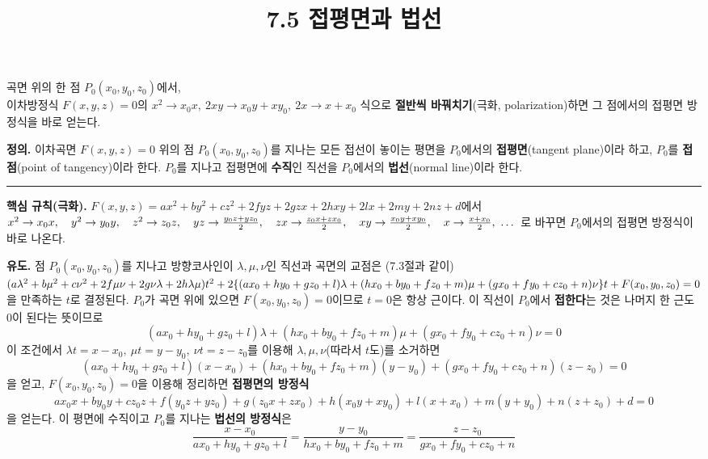 \documentclass{article}
\title{7.5 접평면과 법선}
\date{}
\author{}
\theoremstyle{mystyle}
\begin{document}
\maketitle

\begin{tcolorbox}[colback=blue!5, colframe=blue!60!black, title=7.5 접평면과 법선 -- 한눈에 보기, boxrule=0.5mm, arc=3mm]
곡면 위의 한 점 \(P_0(x_0,y_0,z_0)\)에서,\\ 이차방정식 \(F(x,y,z)=0\)의 \(x^2\to x_0x,\ 2xy\to x_0y+xy_0,\ 2x\to x+x_0\) 식으로 \textbf{절반씩 바꿔치기}(극화, polarization)하면 그 점에서의 접평면 방정식을 바로 얻는다.
\end{tcolorbox}

\begin{tcolorbox}[
    colback=teal!4,
    colframe=teal!65!black,
    title=정의 \& 핵심 규칙,
    fonttitle=\bfseries,
    boxrule=0.5mm,
    arc=3mm
    ]
    \textbf{\textcolor{teal!65!black}{정의.}}\quad
    이차곡면 \(F(x,y,z)=0\) 위의 점 \(P_0(x_0,y_0,z_0)\)를 지나는 모든 접선이 놓이는 평면을 \(P_0\)에서의 \textbf{접평면}(tangent plane)이라 하고, \(P_0\)를 \textbf{접점}(point of tangency)이라 한다. \(P_0\)를 지나고 접평면에 \textbf{수직}인 직선을 \(P_0\)에서의 \textbf{법선}(normal line)이라 한다.

    \noindent\textcolor{teal!50!black}{\rule{\linewidth}{0.4pt}}

    \textbf{\textcolor{teal!65!black}{핵심 규칙(극화).}}\quad
    \(F(x,y,z)=ax^2+by^2+cz^2+2fyz+2gzx+2hxy+2lx+2my+2nz+d\)에서 \\
    $
    x^2\to x_0x,\quad y^2\to y_0y,\quad z^2\to z_0z,\\
    \quad yz\to\tfrac{y_0z+yz_0}{2},\quad zx\to\tfrac{z_0x+zx_0}{2},\quad xy\to\tfrac{x_0y+xy_0}{2},\\
    \quad x\to\tfrac{x+x_0}{2},\ \dots
    $
    로 바꾸면 \(P_0\)에서의 접평면 방정식이 바로 나온다.
\end{tcolorbox}

\textbf{유도.} 점 \(P_0(x_0,y_0,z_0)\)를 지나고 방향코사인이 \(\lambda,\mu,\nu\)인 직선과 곡면의 교점은 (7.3절과 같이)\\
$
(a\lambda^2+b\mu^2+c\nu^2+2f\mu\nu+2g\nu\lambda+2h\lambda\mu)t^2\\
+2\{(ax_0+hy_0+gz_0+l)\lambda+(hx_0+by_0+fz_0+m)\mu+(gx_0+fy_0+cz_0+n)\nu\}t\\
+F(x_0,y_0,z_0)=0
$ \\
을 만족하는 \(t\)로 결정된다. \(P_0\)가 곡면 위에 있으면 \(F(x_0,y_0,z_0)=0\)이므로 \(t=0\)은 항상 근이다. 이 직선이 \(P_0\)에서 \textbf{접한다}는 것은 나머지 한 근도 \(0\)이 된다는 뜻이므로
\[
(ax_0+hy_0+gz_0+l)\lambda+(hx_0+by_0+fz_0+m)\mu+(gx_0+fy_0+cz_0+n)\nu=0
\]
이 조건에서 \(\lambda t=x-x_0,\ \mu t=y-y_0,\ \nu t=z-z_0\)를 이용해 \(\lambda,\mu,\nu\)(따라서 \(t\)도)를 소거하면
\[
(ax_0+hy_0+gz_0+l)(x-x_0)+(hx_0+by_0+fz_0+m)(y-y_0)+(gx_0+fy_0+cz_0+n)(z-z_0)=0
\]
을 얻고, \(F(x_0,y_0,z_0)=0\)을 이용해 정리하면 \textbf{접평면의 방정식}
\[
ax_0x+by_0y+cz_0z+f(y_0z+yz_0)+g(z_0x+zx_0)+h(x_0y+xy_0)+l(x+x_0)+m(y+y_0)+n(z+z_0)+d=0
\]
을 얻는다. 이 평면에 수직이고 \(P_0\)를 지나는 \textbf{법선의 방정식}은
\[
\frac{x-x_0}{ax_0+hy_0+gz_0+l}=\frac{y-y_0}{hx_0+by_0+fz_0+m}=\frac{z-z_0}{gx_0+fy_0+cz_0+n}
\]
\end{document}
